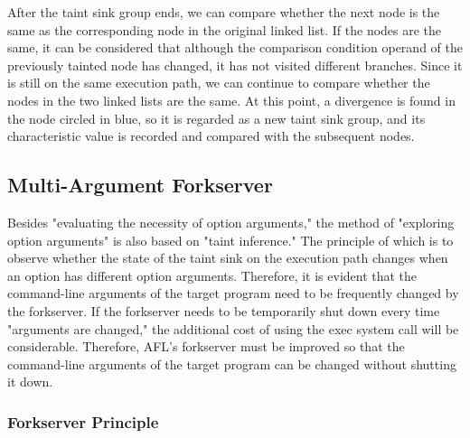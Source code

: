 After the taint sink group ends, we can compare whether the next node is the same as the corresponding node in the original linked list. If the nodes are the same, it can be considered that although the comparison condition operand of the previously tainted node has changed, it has not visited different branches. Since it is still on the same execution path, we can continue to compare whether the nodes in the two linked lists are the same. At this point, a divergence is found in the node circled in blue, so it is regarded as a new taint sink group, and its characteristic value is recorded and compared with the subsequent nodes.

\subsection{Multi-Argument Forkserver}
\label{subsec:forkserver}

\iffalse
除了「評估選項參數必要性」外，「探索選項參數」的方法也是建立於「污染源推論」上。「污染源推論」的原理是：觀察一個選項帶有不同的選項參數時，執行路徑上污染終點的狀態是否發生改變。由此可見，目標程式的命令列參數需由 forkserver 經常改變。若是每次「參數改變」都需要暫時關閉 forkserver，使用 exec 系統呼叫的額外成本將會相當可觀。因此，AFL的 forkserver 必須改良成：在不關閉的情況下，也能更換目標程式的命令列參數。
\else
Besides "evaluating the necessity of option arguments," the method of "exploring option arguments" is also based on "taint inference." The principle of which is to observe whether the state of the taint sink on the execution path changes when an option has different option arguments. Therefore, it is evident that the command-line arguments of the target program need to be frequently changed by the forkserver. If the forkserver needs to be temporarily shut down every time "arguments are changed," the additional cost of using the exec system call will be considerable. Therefore, AFL's forkserver must be improved so that the command-line arguments of the target program can be changed without shutting it down.
\fi

\subsubsection{Forkserver Principle}

